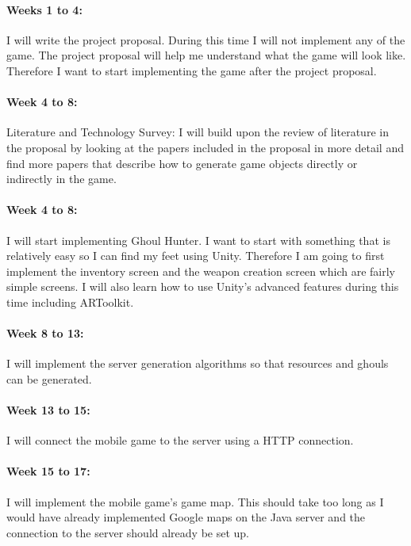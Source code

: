 \documentclass{article}
\begin{document}
		\paragraph{Weeks 1 to 4:} I will write the project proposal. During this time I will not implement any of the game. The project proposal will help me understand what the game will look like. Therefore I want to start implementing the game after the project proposal.
		\newline
		\paragraph{Week 4 to 8:} Literature and Technology Survey: I will build upon the review of literature in the proposal by looking at the papers included in the proposal in more detail and find more papers that describe how to generate game objects directly or indirectly in the game.
		\newline
		\paragraph{Week 4 to 8:} I will start implementing Ghoul Hunter. I want to start with something that is relatively easy so I can find my feet using Unity. Therefore I am going to first implement the inventory screen and the weapon creation screen which are fairly simple screens. I will also learn how to use Unity's advanced features during this time including ARToolkit.
		\newline
		\paragraph{Week 8 to 13:} I will implement the server generation algorithms so that resources and ghouls can be generated. 
		\newline
		\paragraph{Week 13 to 15:} I will connect the mobile game to the server using a HTTP connection. 
		\newline
		\paragraph{Week 15 to 17:} I will implement the mobile game's game map. This should take too long as I would have already implemented Google maps on the Java server and the connection to the server should already be set up.
		\newline
\end{document}
